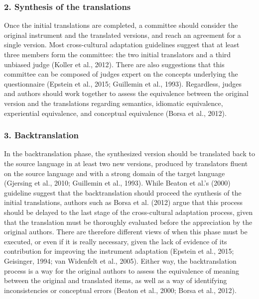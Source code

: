\documentclass[
  ,doc,11pt, twoside,floatsintext]{apa6}
\begin{document}
\hypertarget{synthesis-of-the-translations}{%
\subsubsection{2. Synthesis of the translations}\label{synthesis-of-the-translations}}

Once the initial translations are completed, a committee should consider the original instrument and the translated versions, and reach an agreement for a single version. Most cross-cultural adaptation guidelines suggest that at least three members form the committee: the two initial translators and a third unbiased judge (Koller et al., 2012). There are also suggestions that this committee can be composed of judges expert on the concepts underlying the questionnaire (Epstein et al., 2015; Guillemin et al., 1993). Regardless, judges and authors should work together to assess the equivalence between the original version and the translations regarding semantics, idiomatic equivalence, experiential equivalence, and conceptual equivalence (Borsa et al., 2012).

\hypertarget{backtranslation}{%
\subsubsection{3. Backtranslation}\label{backtranslation}}

In the backtranslation phase, the synthesized version should be translated back to the source language in at least two new versions, produced by translators fluent on the source language and with a strong domain of the target language (Gjersing et al., 2010; Guillemin et al., 1993). While Beaton et al.'s (2000) guideline suggest that the backtranslation should proceed the synthesis of the initial translations, authors such as Borsa et al. (2012) argue that this process should be delayed to the last stage of the cross-cultural adaptation process, given that the translation must be thoroughly evaluated before the appreciation by the original authors. There are therefore different views of when this phase must be executed, or even if it is really necessary, given the lack of evidence of its contribution for improving the instrument adaptation (Epstein et al., 2015; Geisinger, 1994; van Widenfelt et al., 2005). Either way, the backtranslation process is a way for the original authors to assess the equivalence of meaning between the original and translated items, as well as a way of identifying inconsistencies or conceptual errors (Beaton et al., 2000; Borsa et al., 2012).
\end{document}

